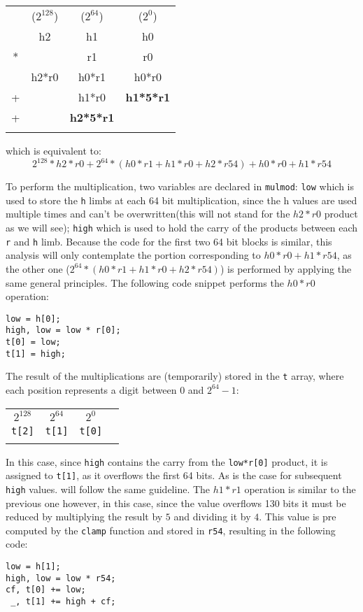 \documentclass{article}
\begin{document}
\begin{tabular}{cccc}
\\
    &($2^{128}$)& ($2^{64}$)        & ($2^{0}$)         \\
    & h2        & h1                & h0                \\
*   &           & r1                & r0                \\
\hline
    & h2*r0     & h0*r1             & h0*r0             \\ 
+   &           & h1*r0             & \textbf{h1*5*r1}  \\
+   &           & \textbf{h2*5*r1}  &                   \\
\\
\end{tabular}


which is equivalent to:
$$ 2^{128}*h2*r0 + 2^{64}*(h0*r1+h1*r0+h2*r54) + h0*r0+h1*r54 $$

To perform the multiplication, two variables are declared in \texttt{mulmod}: \texttt{low} which is used to store the \texttt{h} limbs at each 64 bit 
multiplication, since the h values are used multiple times and can't be overwritten(this will not stand for the $h2*r0$ product as we will see); \texttt{high} 
which is used to hold the carry of the products between each \texttt{r} and \texttt{h} limb. 
Because the code for the first two 64 bit blocks is similar, this analysis will only contemplate the portion corresponding to $h0*r0+h1*r54$, as the other 
one ($2^{64}*(h0*r1+h1*r0+h2*r54)$) is performed by applying the same general principles. The following code snippet performs the $h0*r0$ operation:

\begin{Verbatim}
low = h[0];
high, low = low * r[0];
t[0] = low;
t[1] = high;
\end{Verbatim}

The result of the multiplications are (temporarily) stored in the \texttt{t} array, where each position represents a digit between $0$ and $2^{64}-1$:

\begin{tabular}{cccc}
\\
$2^{128}$       & $2^{64}$        & $2^{0}$         \\
\texttt{t[2]}   & \texttt{t[1]}   & \texttt{t[0]}   \\
\\
\end{tabular}

In this case, since \texttt{high} contains the carry from the \texttt{low*r[0]} product, it is assigned to \texttt{t[1]}, as it overflows the first 64 bits. 
As is the case for subsequent \texttt{high} values. will follow the same guideline.
The $h1*r1$ operation is similar to the previous one however, in this case, since the value overflows 130 bits it must be reduced by multiplying the result by 
$5$ and dividing it by $4$. This value is pre computed by the \texttt{clamp} function and stored in \texttt{r54}, resulting in the following code:
\begin{Verbatim}
low = h[1];
high, low = low * r54;
cf, t[0] += low;
 _, t[1] += high + cf;
\end{Verbatim}
\end{document}

